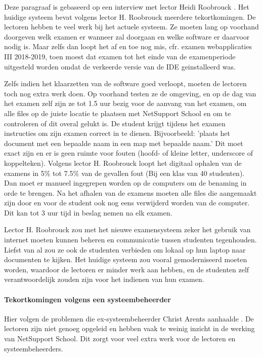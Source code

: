 Deze paragraaf is gebaseerd op een interview met lector Heidi Roobrouck \autocite{Roobrouck2019}. Het huidige systeem bevat volgens lector H. Roobrouck meerdere tekortkomingen. De lectoren hebben te veel werk bij het actuele systeem. Ze moeten lang op voorhand doorgeven welk examen er wanneer zal doorgaan en welke software er daarvoor nodig is. Maar zelfs dan loopt het af en toe nog mis, cfr. examen webapplicaties III 2018-2019, toen moest dat examen tot het einde van de examenperiode uitgesteld worden omdat de verkeerde versie van de IDE geinstalleerd was.

Zelfs indien het klaarzetten van de software goed verloopt, moeten de lectoren toch nog extra werk doen. Op voorhand testen ze de omgeving, en op de dag van het examen zelf zijn ze tot 1.5 uur bezig voor de aanvang van het examen, om alle files op de juiste locatie te plaatsen met NetSupport School en om te controleren of dit overal gelukt is. De student krijgt tijdens het examen instructies om zijn examen correct in te dienen. Bijvoorbeeld: 'plaats het document met een bepaalde naam in een map met bepaalde naam.' Dit moet exact zijn en er is geen ruimte voor fouten (hoofd- of kleine letter, underscore of koppelteken). Volgens lector H. Roobrouck loopt het digitaal ophalen van de examens in 5\% tot 7.5\% van de gevallen fout (Bij een klas van 40 studenten).
Dan moet er manueel ingegrepen worden op de computers om de benaming in orde te brengen. Na het afhalen van de examens moeten alle files die aangemaakt zijn door en voor de student ook nog eens verwijderd worden van de computer. Dit kan tot 3 uur tijd in beslag nemen na elk examen.  

Lector H. Roobrouck zou met het nieuwe examensysteem zeker het gebruik van internet moeten kunnen beheren en communicatie tussen studenten tegenhouden. Liefst van al zou ze ook de studenten verbieden om lokaal op hun laptop naar documenten te kijken. Het huidige systeem zou vooral gemoderniseerd moeten worden, waardoor de lectoren er minder werk aan hebben, en de studenten zelf verantwoordelijk zouden zijn voor het indienen van hun examen. 


\paragraph{Tekortkomingen volgens een systeembeheerder}
Hier volgen de problemen die ex-systeembeheerder Christ Arents aanhaalde \autocite{Arents2019}. De lectoren zijn niet genoeg opgeleid en hebben vaak te weinig inzicht in de werking van NetSupport School. Dit zorgt voor veel extra werk voor de lectoren en systeembeheerders. 

